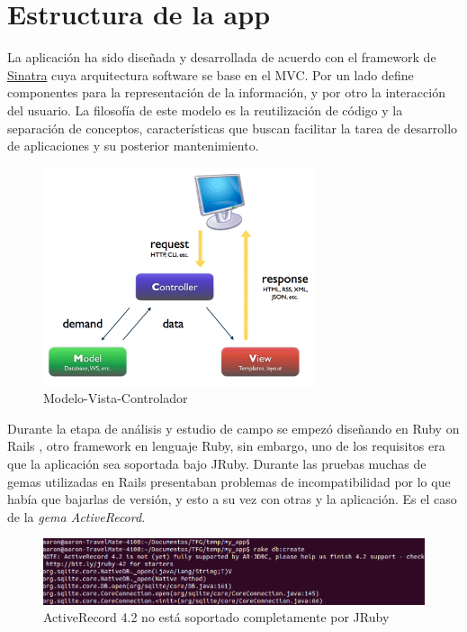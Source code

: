 \section{Estructura de la app}\label{cap.4.2}
La aplicación ha sido diseñada y desarrollada de acuerdo con el framework de \href{http://www.sinatrarb.com/}{Sinatra} cuya arquitectura software se base en el MVC. Por un lado define componentes para la representación de la información, y por otro la interacción del usuario. La filosofía de este modelo es la reutilización de código y la separación de conceptos, características que buscan facilitar la tarea de desarrollo de aplicaciones y su posterior mantenimiento. \\

\begin{figure}[H]
	\centering
	\includegraphics[width=8cm]{./images/mvc.png}
	\caption{Modelo-Vista-Controlador} \label{fig:MVC}
\end{figure}

Durante la etapa de análisis y estudio de campo se empezó diseñando en Ruby on Rails \cite{URL:Rails}, otro framework en lenguaje Ruby, sin embargo, uno de los requisitos era que la aplicación sea soportada bajo JRuby. Durante las pruebas muchas de gemas utilizadas en Rails presentaban problemas de incompatibilidad por lo que había que bajarlas de versión, y esto a su vez con otras y la aplicación. Es el caso de la \emph{gema ActiveRecord}. 

\begin{figure}[H]
	\centering
	\includegraphics[width=12cm]{./images/activerecord-message.png}
	\caption{ActiveRecord 4.2 no está soportado completamente por JRuby} \label{fig:AvtiveRecord-no-supported}
\end{figure}

